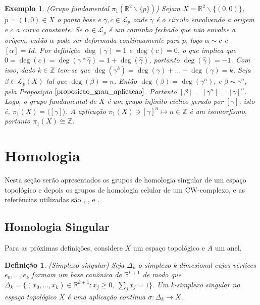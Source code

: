 \documentclass[12pt]{book}
\newtheorem{definicao}[teorema]{Definição}
\newtheorem{exemplo}[teorema]{Exemplo}
\newcommand{\caminhos}{\mathcal{L}}
\newcommand{\caminhospontobase}[1]{\caminhos_{#1}}
\newcommand{\caminhospontobasegeral}[2]{\caminhos_{#1}(#2)}
\newcommand{\classe}[1]{[#1]}
\newcommand{\gerador}[1]{\langle #1\rangle}
\newcommand{\grupofundamental}[1]{\pi_{1}(#1)}
\newcommand{\inteiros}{\mathbb{Z}}
\newcommand{\real}[1]{\mathbb{R}^{#1}}
\begin{document}
	\begin{exemplo}\label{exemplo_grupo_fundamental_plano_furo}
		(Grupo fundamental $\grupofundamental{\real{2}\backslash\{p\}}$) Sejam $X = \real{2}\backslash \{(0,0)\}$, $p=(1,0) \in X$ o ponto base e $\gamma,c \in \caminhospontobase{p}$ onde $\gamma$ é o círculo envolvendo a origem e $c$ a curva constante. Se $\alpha \in \caminhospontobase{p}$ é um caminho fechado que não envolve a origem, então $\alpha$ pode ser deformada contínuamente para $p$, logo $\alpha \sim c$ e $\classe{\alpha} = Id$. Por definição $\deg(\gamma) = 1$ e $\deg(c) =0$, o que implica que $0= \deg(c)=\deg(\gamma*\hat{\gamma} ) = 1 +\deg(\hat{\gamma} )$, portanto $\deg(\hat{\gamma} )=-1$. Com isso, dado $k \in \inteiros$ tem-se que $\deg(\gamma^{k}) = \deg(\gamma)+\dots +\deg(\gamma) = k$. Seja $\beta \in \caminhospontobasegeral{p}{X}$ tal que $\deg(\beta)=n$. Então $\deg(\beta) = \deg(\gamma^{n})$, e $\beta \sim \gamma^{n}$, pela Proposição $\ref{proposicao_grau_aplicacao}$. Portanto $\classe{\beta} =  \classe{\gamma^{n}}=\classe{\gamma}^{n}$. Logo, o grupo fundamental de $X$ é um grupo infinito cíclico gerado por $\classe{\gamma}$, isto é, $\grupofundamental{X} = \gerador{\classe{\gamma}}$. A aplicação $\grupofundamental{X} \ni \classe{\gamma}^{n} \mapsto n \in \inteiros$ é um isomorfismo, portanto $\grupofundamental{X} \cong \inteiros$.
	\end{exemplo}
		
	\section{Homologia}
	Nesta seção serão apresentados os grupos de homologia singular de um espaço topológico e depois os grupos de homologia celular de um CW-complexo, e as referências utilizadas são \cite{banyaga_morse_homology}, \cite{elon_homologia}, \cite{massey} e \cite{vick_homology}. 
	
	\subsection{Homologia Singular}
	Para as próximas definições, considere $X$ um espaço topológico e $A$ um anel.
	\begin{definicao}
		(Simplexo singular) Seja $\Delta_{k}$ o simplexo k-dimesional cujos vértices $e_{0}, \dots, e_{k}$ formam um base canônica de $\real{k+1}$ de modo que $\Delta_{k} = \{(x_{0}, \dots, x_{k}) \in \real{k+1}: x_{j}\geq 0, \;\sum_{j}x_{j}=1\}$. Um k-simplexo singular no espaço topológico $X$ é uma aplicação contínua $\sigma:\Delta_{k} \to X$.
	\end{definicao}
	
\end{document}
